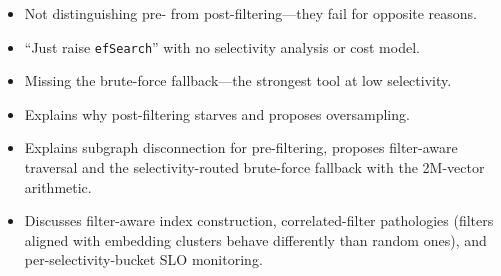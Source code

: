 \begin{interviewq}
\redflags
\begin{itemize}
    \item Not distinguishing pre- from post-filtering---they fail for opposite reasons.
    \item ``Just raise \texttt{efSearch}'' with no selectivity analysis or cost model.
    \item Missing the brute-force fallback---the strongest tool at low selectivity.
\end{itemize}


\goodgreat
\begin{itemize}
    \item {} Explains why post-filtering starves and proposes oversampling.
    \item {} Explains subgraph disconnection for pre-filtering, proposes filter-aware traversal and the selectivity-routed brute-force fallback with the 2M-vector arithmetic.
    \item {} Discusses filter-aware index construction, correlated-filter pathologies (filters aligned with embedding clusters behave differently than random ones), and per-selectivity-bucket SLO monitoring.
\end{itemize}

\end{interviewq}


